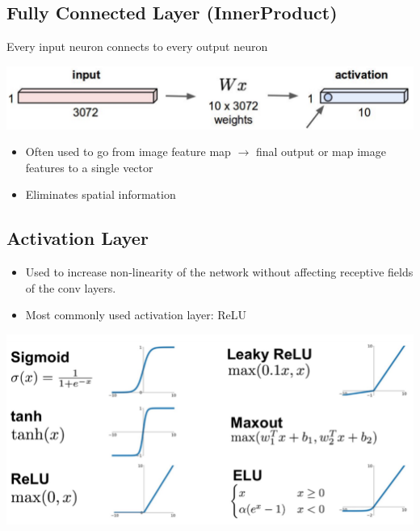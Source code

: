 \documentclass[10pt]{article}
\begin{document}
\subsection*{Fully Connected Layer (InnerProduct)}
Every input neuron connects to every output neuron

\begin{center} 
	\includegraphics*[width=\textwidth]{L2_21.png} 
\end{center}
\begin{itemize}
	\item Often used to go from image feature map $\rightarrow$ final output or map image features to a single vector
	\item Eliminates spatial information
\end{itemize}

\subsection*{Activation Layer}
\begin{itemize}
	\item Used to increase non-linearity of the network without affecting receptive fields of the conv layers.
	\item Most commonly used activation layer: ReLU
\end{itemize}
\begin{center} 
	\includegraphics*[width=\textwidth]{L2_22.png} 
\end{center}
\end{document}
